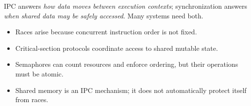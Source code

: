 \begin{keyidea}
IPC answers \emph{how data moves between execution contexts}; synchronization answers \emph{when shared data may be safely accessed}. Many systems need both.
\end{keyidea}





\begin{chapterrecap}
\begin{itemize}
  \item Races arise because concurrent instruction order is not fixed.
  \item Critical-section protocols coordinate access to shared mutable state.
  \item Semaphores can count resources and enforce ordering, but their operations must be atomic.
  \item Shared memory is an IPC mechanism; it does not automatically protect itself from races.
\end{itemize}
\end{chapterrecap}
